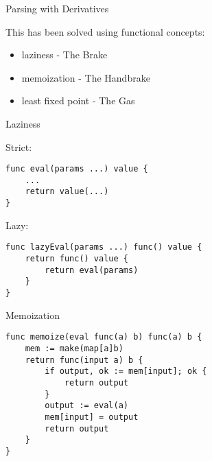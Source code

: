 \documentclass[10pt]{beamer}
\begin{document}
\begin{frame}{Parsing with Derivatives}


This has been solved using \cite{might2011parsing} functional concepts:
\begin{itemize}
\item laziness - The Brake
\item memoization - The Handbrake
\item least fixed point - The Gas
\end{itemize}
\end{frame}

\begin{frame}[fragile]{Laziness}

Strict:

\begin{verbatim}
func eval(params ...) value {
    ...
    return value(...)
}
\end{verbatim}

Lazy:

\begin{verbatim}
func lazyEval(params ...) func() value {
    return func() value {
        return eval(params)
    }
}
\end{verbatim}
\end{frame}

\begin{frame}[fragile]{Memoization}


\begin{verbatim}
func memoize(eval func(a) b) func(a) b {
    mem := make(map[a]b)
    return func(input a) b {
        if output, ok := mem[input]; ok {
            return output
        }
        output := eval(a)
        mem[input] = output
        return output
    }
}
\end{verbatim}

\end{frame}
\end{document}
